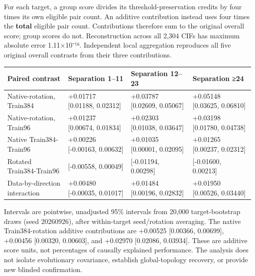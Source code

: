 For each target, a group score divides its threshold-preservation credits by
four times its own eligible pair count. An additive contribution instead uses
four times the \textbf{total} eligible pair count. Contributions therefore sum to
the original overall score; group scores do not. Reconstruction across all
2,304 CIFs has maximum absolute error 1.11×10⁻¹⁶. Independent local aggregation
reproduces all five original overall contrasts from their three contributions.

\begin{longtable}[]{@{}
  >{\raggedright\arraybackslash}p{}
  >{\raggedleft\arraybackslash}p{}
  >{\raggedleft\arraybackslash}p{}
  >{\raggedleft\arraybackslash}p{}@{}}
\toprule\noalign{}
\begin{minipage}[b]{\linewidth}\raggedright
Paired contrast
\end{minipage} & \begin{minipage}[b]{\linewidth}\raggedleft
Separation 1--11
\end{minipage} & \begin{minipage}[b]{\linewidth}\raggedleft
Separation 12--23
\end{minipage} & \begin{minipage}[b]{\linewidth}\raggedleft
Separation ≥24
\end{minipage} \\
\midrule\noalign{}
\endhead
\bottomrule\noalign{}
\endlastfoot
Native-rotation, Train384 & +0.01717 {[}0.01188, 0.02312{]} & +0.03787 {[}0.02609, 0.05067{]} & +0.05148 {[}0.03625, 0.06810{]} \\
Native-rotation, Train96 & +0.01237 {[}0.00674, 0.01834{]} & +0.02303 {[}0.01038, 0.03647{]} & +0.03198 {[}0.01780, 0.04738{]} \\
Native Train384-Train96 & +0.00226 {[}-0.00163, 0.00632{]} & +0.01035 {[}0.00001, 0.02095{]} & +0.01265 {[}0.00237, 0.02312{]} \\
Rotated Train384-Train96 & -0.00254 {[}-0.00558, 0.00049{]} & -0.00449 {[}-0.01194, 0.00298{]} & -0.00685 {[}-0.01600, 0.00213{]} \\
Data-by-direction interaction & +0.00480 {[}-0.00035, 0.01017{]} & +0.01484 {[}0.00196, 0.02832{]} & +0.01950 {[}0.00526, 0.03440{]} \\
\end{longtable}

Intervals are pointwise, unadjusted 95\% intervals from 20,000 target-bootstrap
draws (seed 20260926), after within-target seed/rotation averaging. The native
Train384-rotation additive contributions are +0.00525 {[}0.00366, 0.00699{]},
+0.00456 {[}0.00320, 0.00603{]}, and +0.02970 {[}0.02086, 0.03934{]}. These are additive
score units, not percentages of causally explained performance. The analysis
does not isolate evolutionary covariance, establish global-topology recovery,
or provide new blinded confirmation.

